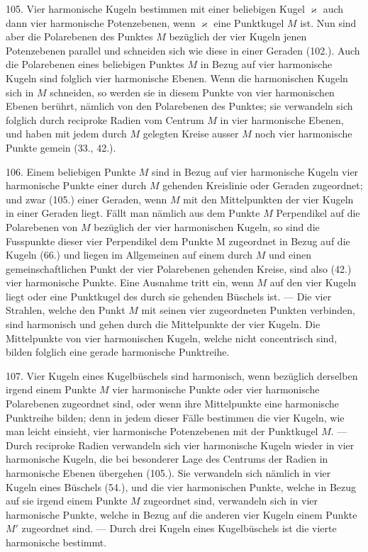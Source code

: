 105. Vier harmonische Kugeln bestimmen mit einer beliebigen
Kugel $\varkappa$ auch dann vier harmonische Potenzebenen,
wenn $\varkappa$ eine Punktkugel $M$ ist. Nun sind aber die Polarebenen
des Punktes $M$ bez\"uglich der vier Kugeln jenen Potenzebenen
parallel und schneiden sich wie diese in einer
Geraden (102.). Auch die Polarebenen eines beliebigen
Punktes $M$ in Bezug auf vier harmonische Kugeln sind folglich
vier harmonische Ebenen. Wenn die harmonischen
Kugeln sich in $M$ schneiden, so werden sie in diesem Punkte
von vier harmonischen Ebenen ber\"uhrt, n\"amlich von den
Polarebenen des Punktes; sie verwandeln sich folglich durch
reciproke Radien vom Centrum $M$ in vier harmonische Ebenen,
und haben mit jedem durch $M$ gelegten Kreise ausser
$M$ noch vier harmonische Punkte gemein (33., 42.).

106. Einem beliebigen Punkte $M$ sind in Bezug auf
vier harmonische Kugeln vier harmonische Punkte einer
durch $M$ gehenden Kreislinie oder Geraden zugeordnet; und
zwar (105.) einer Geraden, wenn $M$ mit den Mittelpunkten
der vier Kugeln in einer Geraden liegt. F\"allt man n\"amlich
aus dem Punkte $M$ Perpendikel auf die Polarebenen von $M$
bez\"uglich der vier harmonischen Kugeln, so sind die Fusspunkte
dieser vier Perpendikel dem Punkte M zugeordnet
in Bezug auf die Kugeln (66.) und liegen im Allgemeinen
auf einem durch $M$ und einen gemeinschaftlichen Punkt der
vier Polarebenen gehenden Kreise, sind also (42.) vier harmonische
Punkte. Eine Ausnahme tritt ein, wenn $M$ auf
den vier Kugeln liegt oder eine Punktkugel des durch sie
gehenden B\"uschels ist. --- Die vier Strahlen, welche den
Punkt $M$ mit seinen vier zugeordneten Punkten verbinden,
sind harmonisch und gehen durch die Mittelpunkte der vier
Kugeln. Die Mittelpunkte von vier harmonischen Kugeln,
welche nicht concentrisch sind, bilden folglich eine gerade
harmonische Punktreihe.

107. Vier Kugeln eines Kugelb\"uschels sind harmonisch,
wenn bez\"uglich derselben irgend einem Punkte $M$ vier harmonische
Punkte oder vier harmonische Polarebenen zugeordnet
sind, oder wenn ihre Mittelpunkte eine harmonische
Punktreihe bilden; denn in jedem dieser F\"alle bestimmen die
vier Kugeln, wie man leicht einsieht, vier harmonische Potenzebenen
mit der Punktkugel $M$. --- Durch reciproke Radien
verwandeln sich vier harmonische Kugeln wieder in
vier harmonische Kugeln, die bei besonderer Lage des Centrums
der Radien in harmonische Ebenen \"ubergehen (105.).
Sie verwandeln sich n\"amlich in vier Kugeln eines B\"uschels
(54.), und die vier harmonischen Punkte, welche in Bezug
auf sie irgend einem Punkte $M$ zugeordnet sind, verwandeln
sich in vier harmonische Punkte, welche in Bezug auf die
anderen vier Kugeln einem Punkte $M'$ zugeordnet sind. --- Durch
drei Kugeln eines Kugelb\"uschels ist die vierte harmonische
bestimmt.

